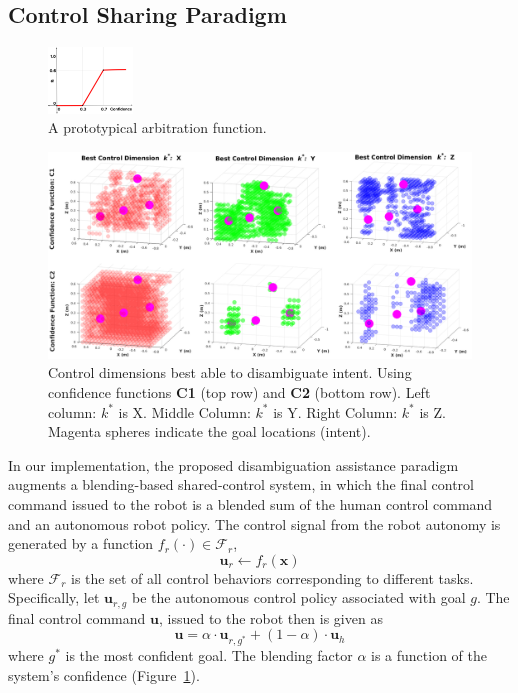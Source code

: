 \documentclass[conference]{IEEEtran}
\begin{document}
\subsection{Control Sharing Paradigm}\label{BP}
\begin{figure}
	\begin{center}
		\vspace{-0.9cm}
		\includegraphics[width=0.2\textwidth]{./figures/ArbFunc_New1.png}
	\end{center}
	\vspace{-.3cm}
	\caption{A prototypical arbitration function.}
	\label{ALPHA}
\end{figure}
\begin{figure}[ht]
	\centering
	\includegraphics[width = 1\hsize, height = 0.35\vsize]{./figures/POINT_CLOUD.png}
	\caption{Control dimensions best able to disambiguate intent. Using confidence functions \textbf{C1} (top row) and \textbf{C2} (bottom row). Left column: $k^*$ is X. Middle Column: $k^*$ is Y. Right Column: $k^*$ is Z. Magenta spheres indicate the goal locations (intent).}
	\label{HM_SEP}
\end{figure}
In our implementation, the proposed disambiguation assistance paradigm augments a blending-based shared-control system, in which the final control command issued to the robot is a blended sum of the human control command and an autonomous robot policy. 
The control signal from the robot autonomy is generated by a function $f_{r}(\cdot) \in \mathcal{F}_{r}$, 
\begin{equation*}
\boldsymbol{u}_r \leftarrow f_{r}(\boldsymbol{x})
\end{equation*}
where $\mathcal{F}_{r}$ is the set of all control behaviors corresponding to different tasks.
Specifically, let $\boldsymbol{u}_{r,g}$ be the autonomous control policy associated with goal $g$. The final control command $\boldsymbol{u}$, issued to the robot then is given as 
\begin{equation*}
\boldsymbol{u} = \alpha\cdot \boldsymbol{u}_{r,g^*} + (1 - \alpha)\cdot \boldsymbol{u}_h
\end{equation*}
where $g^*$ is the most confident goal. The blending factor $\alpha$ is a function of the system's confidence (Figure~\ref{ALPHA}).
\end{document}
